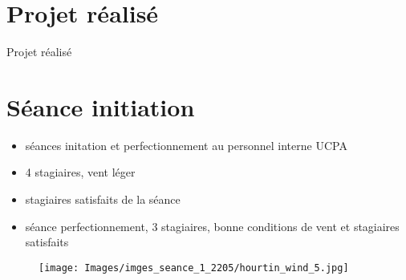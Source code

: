 \documentclass[10pt,a4paper]{beamer}
\begin{document}
\section{Projet réalisé}
\begin{frame}{Projet réalisé}
\section{Séance initiation}
\begin{itemize}
\item séances initation et perfectionnement au personnel interne UCPA
\item 4 stagiaires, vent léger
\item stagiaires satisfaits de la séance
\item séance perfectionnement, 3 stagiaires, bonne conditions de vent et stagiaires satisfaits
\end{itemize}
\begin{figure}
\texttt{[image: Images/imges\_seance\_1\_2205/hourtin\_wind\_5.jpg]} 
\end{figure}
\end{frame}
\end{document}
